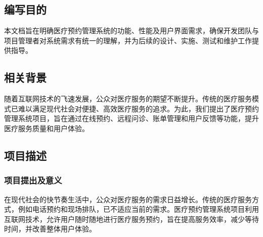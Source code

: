 \subsection{编写目的}
本文档旨在明确医疗预约管理系统的功能、性能及用户界面需求，确保开发团队与项目管理者对系统需求有统一的理解，并为后续的设计、实施、测试和维护工作提供指导。

\subsection{相关背景}
随着互联网技术的飞速发展，公众对医疗服务的期望不断提升。传统的医疗服务模式已难以满足现代社会对便捷、高效医疗服务的追求。为此，我们提出了医疗预约管理系统项目，旨在通过在线预约、远程问诊、账单管理和用户反馈等功能，提升医疗服务质量和用户体验。

\subsection{项目描述}
\subsubsection{项目提出及意义}
在现代社会的快节奏生活中，公众对医疗服务的需求日益增长。传统的医疗服务方式，例如电话预约和现场排队，已不适应当前的需求。医疗预约管理系统项目利用互联网技术，允许用户随时随地进行医疗服务预约，旨在提高服务效率，减少等待时间，并改善整体用户体验。

